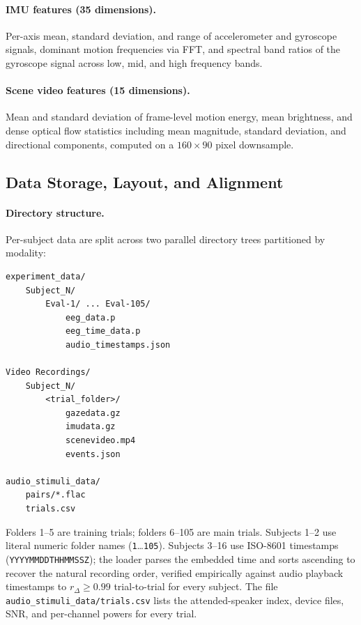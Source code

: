 \documentclass{article}
\begin{document}
\paragraph{IMU features (35 dimensions).}
Per-axis mean, standard deviation, and range of accelerometer and gyroscope 
signals, dominant motion frequencies via FFT, and spectral band ratios of the 
gyroscope signal across low, mid, and high frequency bands.

\paragraph{Scene video features (15 dimensions).}
Mean and standard deviation of frame-level motion energy, mean brightness, 
and dense optical flow statistics including mean magnitude, standard deviation, 
and directional components, computed on a $160 \times 90$ pixel downsample.



\subsection{Data Storage, Layout, and Alignment}
\label{app:storage}

\paragraph{Directory structure.} Per-subject data are split across two
parallel directory trees partitioned by modality:

\begin{verbatim}
experiment_data/
    Subject_N/
        Eval-1/ ... Eval-105/
            eeg_data.p
            eeg_time_data.p
            audio_timestamps.json

Video Recordings/
    Subject_N/
        <trial_folder>/
            gazedata.gz
            imudata.gz
            scenevideo.mp4
            events.json

audio_stimuli_data/
    pairs/*.flac
    trials.csv
\end{verbatim}

Folders 1--5 are training trials; folders 6--105 are main trials. Subjects
1--2 use literal numeric folder names (\texttt{1}\ldots\texttt{105}).
Subjects 3--16 use ISO-8601 timestamps (\texttt{YYYYMMDDTHHMMSSZ}); the
loader parses the embedded time and sorts ascending to recover the natural
recording order, verified empirically against audio playback timestamps to
$r_\Delta \ge 0.99$ trial-to-trial for every subject. The file
\texttt{audio\_stimuli\_data/trials.csv} lists the attended-speaker index,
device files, SNR, and per-channel powers for every trial.
\end{document}
